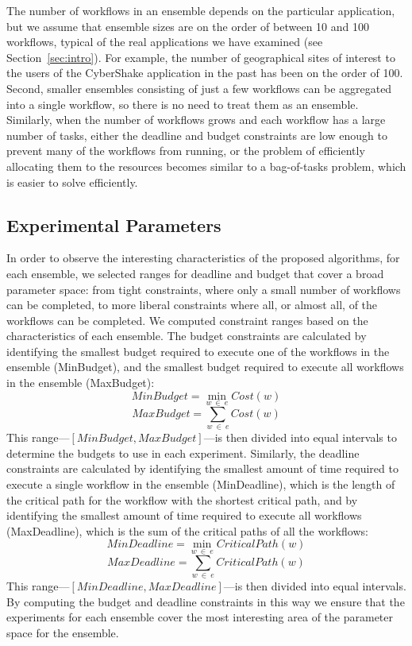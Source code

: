 \documentclass[preprint,5p]{elsarticle}
\begin{document}
The number of workflows in an ensemble depends on the particular application,
but we assume that ensemble sizes are on the order of between 10 and 100
workflows, typical of the real applications we have examined (see Section~\ref{sec:intro}). 
For example, the number of
geographical sites of interest to the users of the CyberShake application in
the past has been on the order of 100. 
Second, smaller ensembles consisting of
just a few workflows can be aggregated into a single workflow, so there is no need to
treat them as an ensemble. Similarly, when the number of workflows grows and
each workflow has a large number of tasks, either the deadline and budget
constraints are low enough to prevent many of the workflows from running, or the
problem of efficiently allocating them to the resources becomes similar to a
bag-of-tasks problem, which is easier to solve efficiently.



\subsection{Experimental Parameters}
\label{sec:exp-parameters}

In order to observe the interesting characteristics of the proposed algorithms,
for each ensemble, we selected ranges for deadline and budget that cover a broad
parameter space: from tight constraints, where only a small number of workflows can be completed,
to more liberal constraints where all, or almost all, of the workflows can be
completed. We computed constraint ranges based on
the characteristics of each ensemble. The budget constraints are calculated by
identifying the smallest budget required to execute one of the workflows in the
ensemble (MinBudget), and the smallest budget required to execute all workflows
in the ensemble (MaxBudget):
%
$$
MinBudget = \min_{w\ \in\ e}{Cost(w)}
$$
$$
MaxBudget = \sum_{w\ \in\ e}{Cost(w)}
$$
%
This range---$[MinBudget, MaxBudget]$---is then divided into equal intervals to
determine the budgets to use in each experiment. Similarly, the deadline
constraints are calculated by identifying the smallest amount
of time required to execute a single workflow in the ensemble (MinDeadline),
which is the length of the critical path for the workflow with the shortest
critical path, and by identifying the smallest amount of time required to
execute all workflows (MaxDeadline), which is the sum of the critical paths of
all the workflows:
%
$$
MinDeadline = \min_{w\ \in\ e}{CriticalPath(w)}
$$
$$
MaxDeadline = \sum_{w\ \in\ e}{CriticalPath(w)}
$$
%
This range---$[MinDeadline, MaxDeadline]$---is then divided into equal intervals. 
By computing the budget and deadline constraints in this way we ensure that the
experiments for each ensemble cover the most interesting area of the parameter space for the
ensemble.
\end{document}
